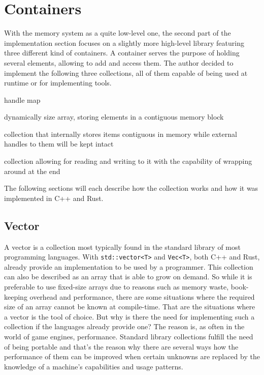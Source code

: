 \newpage

\section{Containers} \label{container_impl}

With the memory system as a quite low-level one, the second part of the implementation section focuses on a slightly more high-level library featuring three different kind of containers. A container serves the purpose of holding several elements, allowing to add and access them. The author decided to implement the following three collections, all of them capable of being used at runtime or for implementing tools.

\begin{labeling}{handle map}
	\item [vector] dynamically size array, storing elements in a contiguous memory block
	\item [handle map] collection that internally stores items contiguous in memory 
	while external handles to them will be kept intact
	\item [ringbuffer] collection allowing for reading and writing to it
	with the capability of wrapping around at the end
\end{labeling}

The following sections will each describe how the collection works and how it was implemented in C++ and Rust.

\subsection{Vector}

A vector is a collection most typically found in the standard library of most programming languages. With \texttt{std::vector<T>} and \texttt{Vec<T>}, both C++ and Rust, already provide an implementation to be used by a programmer. This collection can also be described as an array that is able to grow on demand. So while it is preferable to use fixed-size arrays due to reasons such as memory waste, book-keeping overhead and performance, there are some situations where the required size of an array cannot be known at compile-time. That are the situations where a vector is the tool of choice. But why is there the need for implementing such a collection if the languages already provide one? The reason is, as often in the world of game engines, performance. Standard library collections fulfill the need of being portable and that's the reason why there are several ways how the performance of them can be improved when certain unknowns are replaced by the knowledge of a machine's capabilities and usage patterns. 

